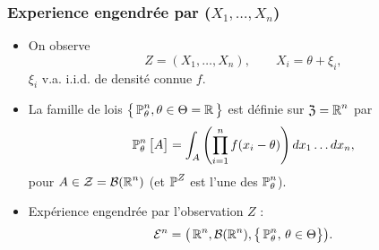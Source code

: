 

\begin{frame}
\frametitle{Experience engendrée par ($X_1,\ldots, X_n$)}
\begin{itemize}
\item On observe
$$Z = (X_1,\ldots, X_n), \quad\quad X_i= \theta + \xi_i,$$
$\xi_i$ v.a. i.i.d. de densit\'e \alert{connue} $f$.
\item La famille de lois $\big\{\operatorname{{\mathbb P}}_\theta^n,\theta \in \Theta  =
\operatorname{{\mathbb R}}\big\}$ est définie sur $\mathfrak{Z}=\operatorname{{\mathbb R}}^n$ par
$$\operatorname{{\mathbb P}}_\theta^n\big[A\big] = \int_A
\left(\prod_{i=1}^n f(x_i-\theta)\right) dx_1\ldots dx_n,
$$
pour $A\in{\mathcal Z}= {\mathcal B}(\operatorname{{\mathbb R}}^n)$ (et $\operatorname{{\mathbb P}}^Z$ est l'une
des $\operatorname{{\mathbb P}}_\theta^n$).
\item Expérience \alert{engendrée par l'observation $Z$} :
$${\mathcal E}^n = \big(\operatorname{{\mathbb R}}^n,{\mathcal B}(\operatorname{{\mathbb R}}^n),\big\{\operatorname{{\mathbb P}}_\theta^n,\,\theta \in \Theta\big\}\big).$$
\end{itemize}
\end{frame}


